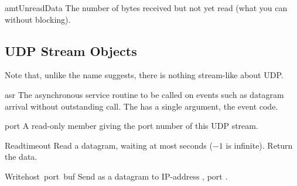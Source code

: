 \begin{datadesc}{amtUnreadData}
The number of bytes received but not yet read (what you can 
without blocking).
\end{datadesc}



\subsection{UDP Stream Objects}
Note that, unlike the name suggests, there is nothing stream-like
about UDP.

\renewcommand{\indexsubitem}{(UDP stream attribute)}

\begin{datadesc}{asr}
The asynchronous service routine to be called on events such as
datagram arrival without outstanding  call. The  has a
single argument, the event code.
\end{datadesc}

\begin{datadesc}{port}
A read-only member giving the port number of this UDP stream.
\end{datadesc}

\renewcommand{\indexsubitem}{(UDP stream method)}

\begin{funcdesc}{Read}{timeout}
Read a datagram, waiting at most  seconds ($-1$ is
infinite).  Return the data.
\end{funcdesc}

\begin{funcdesc}{Write}{host\, port\, buf}
Send  as a datagram to IP-address , port
.
\end{funcdesc}
